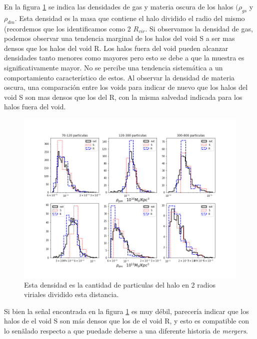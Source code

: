 En la figura \ref{DensCorteMasa} se indica las densidades de gas y materia oscura de los halos $(\rho_{gs}$ y $\rho_{dm}$. Esta densidad es la masa que contiene el halo dividido el radio del mismo (recordemos que los identificamos como 2 $R_{vir}$. Si observamos la densidad de gas, podemos observar una tendencia marginal de los halos del void S a ser mas densos que los halos del void R. Los halos fuera del void pueden alcanzar densidades tanto menores como mayores pero esto se debe a que la muestra es significativamente mayor. No se percibe una tendencia sistem\'atica a un comportamiento caracter\'istico de estos. Al observar la densidad de materia oscura, una comparaci\'on entre los voids para indicar de nuevo que los halos del void S son mas densos que los del R, con la misma salvedad indicada para los halos fuera del void. 






\begin{figure}[h]
\centering
\includegraphics[width=\textwidth]{Figures/Densidades_cortemasa.png}
\decoRule
\caption[asd]{Esta densidad es la cantidad de particulas del halo en 2 radios viriales dividido esta distancia. }
\label{DensCorteMasa}
\end{figure}

Si bien la se\~nal encontrada en la figura \ref{DensCorteMasa} es muy d\'ebil, parecer\'ia indicar que los halos de el void S son m\'as densos que los de el void R, y esto es compatible con lo sen\~alado respecto a que puedade deberse a una diferente historia de \textit{mergers}.



